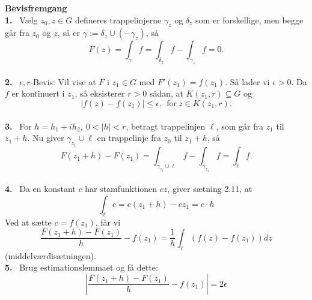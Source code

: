 \documentclass[10pt,a4paper]{article}
\theoremstyle{definition}
\begin{document}
\begin{framed}
\textbf{Bevisfremgang} \\
\textbf{1.} \ Vælg $z_0, z \in G$ defineres trappelinjerne $\gamma_z$ og $\delta_z$ som er forskellige, men begge går fra $z_0$ og $z$, så er $ \gamma := \delta_z \cup (- \gamma_z)$, så
$$ F(z) = \int_{\gamma} f = \int_{\delta_z} f - \int_{\gamma_z} f = 0.$$ \\
\textbf{2.} \  $\epsilon,r$-Bevis: Vil vise at $F$ i $z_1 \in G$ med $F'(z_1) = f(z_1)$. Så lader vi $\epsilon > 0$. Da $f$ er kontinuert i $z_1$, så eksisterer $r > 0$ sådan, at $K(z_1,r) \subseteq G$ og
$$\left| f(z) - f(z_1) \right| \leq \epsilon, \ \ \text{for} \ z \in K(z_1,r).$$  \\
\textbf{3.} \ For $h = h_1 + i h_2, \ 0 < \left| h \right| < r$, betragt trappelinjen $\ell$, som går fra $z_1$ til $z_1 + h$. Nu giver $\gamma_{z_1} \cup \ell$ en trappelinje fra $z_0$ til $z_1 + h$, så
$$ F(z_1 + h) - F(z_1) = \int_{\gamma_{z_1} \cup \ell} f - \int_{\gamma_{z_1}} f = \int_\ell f. $$ \\
\textbf{4.} \ Da en konstant $c$ har stamfunktionen $cz$, giver sætning 2.11, at
$$\int_\ell c = c(z_1 + h) - cz_1 = c \cdot h$$
Ved at sætte $c=f(z_1)$, får vi 
$$\frac{F(z_1 + h) - F(z_1)}{h} - f(z_1) = \frac{1}{h} \int_\ell (f(z) - f(z_1)) dz$$
(middelværdisætningen). \\
\textbf{5.} \ Brug estimationslemmaet og få dette:
$$\left| \frac{F(z_1 + h) - F(z_1)}{h} - f(z_1) \right| = 2 \epsilon$$
\end{framed}
\end{document}
